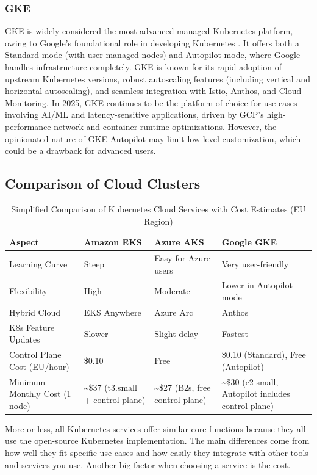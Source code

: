 \subsubsection{GKE}
GKE is widely considered the most advanced managed Kubernetes platform, owing to Google's foundational role in developing Kubernetes \cite{gcp-docs}. It offers both a Standard mode (with user-managed nodes) and Autopilot mode, where Google handles infrastructure completely. GKE is known for its rapid adoption of upstream Kubernetes versions, robust autoscaling features (including vertical and horizontal autoscaling), and seamless integration with Istio, Anthos, and Cloud Monitoring. In 2025, GKE continues to be the platform of choice for use cases involving AI/ML and latency-sensitive applications, driven by GCP's high-performance network and container runtime optimizations. However, the opinionated nature of GKE Autopilot may limit low-level customization, which could be a drawback for advanced users.

\subsection{Comparison of Cloud Clusters}
\begin{table}[h]
\small
\centering
\begin{tabular}{|p{3cm}|p{3.5cm}|p{3.5cm}|p{3.5cm}|}
\hline
\textbf{Aspect} & \textbf{Amazon EKS} & \textbf{Azure AKS} & \textbf{Google GKE} \\
\hline
Learning Curve & Steep & Easy for Azure users & Very user-friendly \\
Flexibility & High & Moderate & Lower in Autopilot mode \\
Hybrid Cloud & EKS Anywhere & Azure Arc & Anthos \\
K8s Feature Updates & Slower & Slight delay & Fastest \\
Control Plane Cost (EU/hour) & \$0.10 & Free & \$0.10 (Standard), Free (Autopilot) \\
Minimum Monthly Cost (1 node) & \textasciitilde\$37 (t3.small + control plane) & \textasciitilde\$27 (B2s, free control plane) & \textasciitilde\$30 (e2-small, Autopilot includes control plane) \\
\hline
\end{tabular}
\caption{Simplified Comparison of Kubernetes Cloud Services with Cost Estimates (EU Region)}
\end{table}




More or less, all Kubernetes services offer similar core functions because they all use the open-source Kubernetes implementation. The main differences come from how well they fit specific use cases and how easily they integrate with other tools and services you use. Another big factor when choosing a service is the cost.

